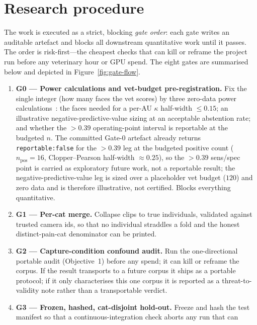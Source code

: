 \section{Research procedure}
\label{sec:intro-procedure}

The work is executed as a strict, blocking \emph{gate order}: each gate writes an
auditable artefact and blocks all downstream quantitative work until it passes.
The order is risk-first---the cheapest checks that can kill or reframe the project
run before any veterinary hour or GPU spend. The eight gates are summarised below
and depicted in Figure~\ref{fig:gate-flow}.

\begin{enumerate}
  \item \textbf{G0 --- Power calculations and vet-budget pre-registration.}
    Fix the single integer (how many faces the vet scores) by three zero-data
    power calculations~\autocite{huanghooker2026fairness,singh2023samplesize}:
    the faces needed for a per-AU $\kappa$ half-width $\leq 0.15$; an
    illustrative negative-predictive-value sizing at an acceptable abstention
    rate; and whether the $>0.39$ operating-point interval is reportable at the
    budgeted $n$. The committed Gate-0 artefact already returns
    \texttt{reportable:false} for the $>0.39$ leg at the budgeted positive count
    ($n_{\text{pos}}{=}16$, Clopper--Pearson half-width $\approx 0.25$), so the
    $>0.39$ sens/spec point is carried as exploratory future work, not a
    reportable result; the negative-predictive-value leg is sized over a
    placeholder vet budget ($120$) and zero data and is therefore illustrative,
    not certified. Blocks everything quantitative.
  \item \textbf{G1 --- Per-cat merge.} Collapse clips to true individuals,
    validated against trusted camera ids, so that no individual straddles a fold
    and the honest distinct-pain-cat denominator can be printed.
  \item \textbf{G2 --- Capture-condition confound audit.} Run the one-directional
    portable audit (Objective~1) before any spend; it can kill or reframe the
    corpus. If the result transports to a future corpus it ships as a portable
    protocol; if it only characterises this one corpus it is reported as a
    threat-to-validity note rather than a transportable verdict.
  \item \textbf{G3 --- Frozen, hashed, cat-disjoint hold-out.} Freeze and hash the
    test manifest so that a continuous-integration check aborts any run that can

\end{enumerate}

